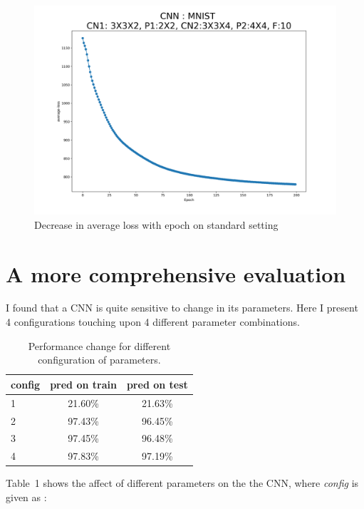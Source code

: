 \documentclass[12pt]{article}
\begin{document}
\begin{figure}
\includegraphics[width=\linewidth]{MNIST-Standard.png}
\caption{Decrease in average loss with epoch on standard setting}
\label{fig-2}
\end{figure}

\section*{A more comprehensive evaluation}

I found that a CNN is quite sensitive to change in its parameters. Here I present 4 configurations touching upon 4 different parameter combinations.

\begin{table}[!hbtp]
\centering
\begin{tabular}{|l|c|c|}
\hline
\textbf{config} & \textbf{pred on train} & \textbf{pred on test} \\\hline
1 & 21.60\% & 21.63\% \\
2 & 97.43\% & 96.45\% \\
3 & 97.45\% & 96.48\% \\
4 & 97.83\% & 97.19\% \\\hline
\end{tabular}
\caption{Performance change for different configuration of parameters.}
\end{table}

Table~1 shows the affect of different parameters on the the CNN, where \textit{config} is given as :
\end{document}
